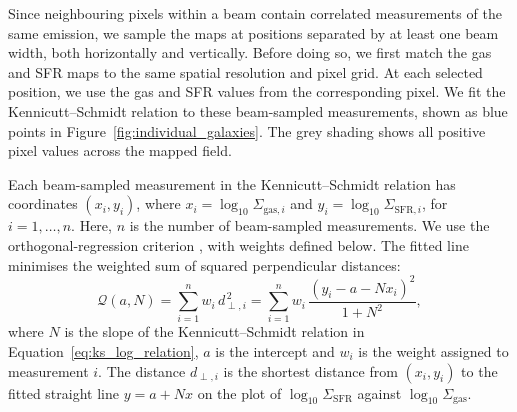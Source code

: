 Since neighbouring pixels within a beam contain correlated measurements of the same emission, we sample the maps at positions separated by at least one beam width, both horizontally and vertically. Before doing so, we first match the gas and SFR maps to the same spatial resolution and pixel grid. At each selected position, we use the gas and SFR values from the corresponding pixel.  We fit the Kennicutt--Schmidt relation to these beam-sampled measurements, shown as blue points in Figure~\ref{fig:individual_galaxies}. The grey shading shows all positive pixel values across the mapped field.

Each beam-sampled measurement in the Kennicutt--Schmidt relation has coordinates $(x_i,y_i)$, where $x_i=\log_{10}\Sigma_{\mathrm{gas},i}$ and $y_i=\log_{10}\Sigma_{\mathrm{SFR},i}$, for $i=1,\ldots,n$. Here, $n$ is the number of beam-sampled measurements. We use the orthogonal-regression criterion \citep{Pearson1901,Isobe1990}, with weights defined below. The fitted line minimises the weighted sum of squared perpendicular distances:
\begin{equation}
\label{eq:ks_weighted_distance}
\mathcal{Q}(a,N)
=\sum_{i=1}^{n} w_i\,d_{\perp,i}^{\,2}
=\sum_{i=1}^{n} w_i\,\frac{(y_i-a-Nx_i)^2}{1+N^2},
\end{equation}
where $N$ is the slope of the Kennicutt--Schmidt relation in Equation~\ref{eq:ks_log_relation}, $a$ is the intercept and $w_i$ is the weight assigned to measurement $i$. The distance $d_{\perp,i}$ is the shortest distance from $(x_i,y_i)$ to the fitted straight line $y=a+Nx$ on the plot of $\log_{10}\Sigma_{\mathrm{SFR}}$ against $\log_{10}\Sigma_{\mathrm{gas}}$.

